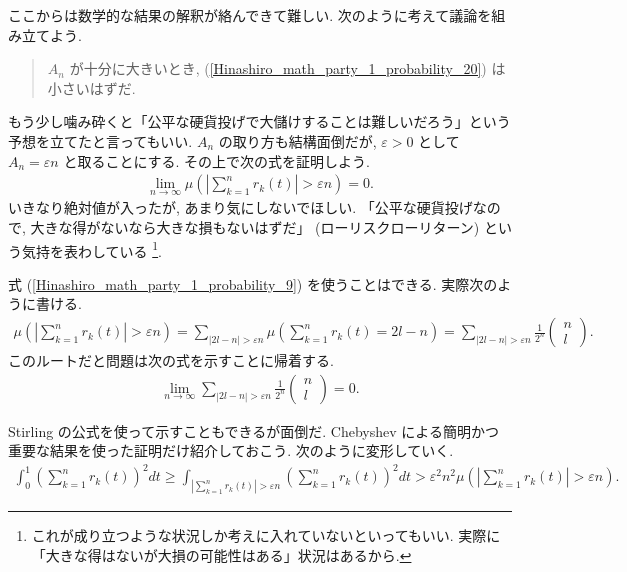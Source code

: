 \documentclass[openany, a4paper, oneside]{jsbook}
\theoremstyle{break}
\theoremstyle{breakdefn}
\newcommand{\abs}[1]{\left|#1\right|}
\newcommand{\rbk}[1]{\left (#1\right)}
\newcommand{\limntoinfty}{\lim_{n \to \infty}}
\begin{document}
ここからは数学的な結果の解釈が絡んできて難しい.
次のように考えて議論を組み立てよう.
\begin{quote}
$A_n$ が十分に大きいとき, (\ref{Hinashiro_math_party_1_probability_20}) は小さいはずだ.
\end{quote}

もう少し噛み砕くと「公平な硬貨投げで大儲けすることは難しいだろう」という予想を立てたと言ってもいい.
$A_n$ の取り方も結構面倒だが, $\varepsilon > 0$ として $A_n = \varepsilon n$ と取ることにする.
その上で次の式を証明しよう.
\begin{align}
 \limntoinfty \mu \rbk{\abs{\sum_{k=1}^n r_k (t)} > \varepsilon n} = 0. \label{Hinashiro_math_party_1_probability_8}
\end{align}
いきなり絶対値が入ったが, あまり気にしないでほしい.
「公平な硬貨投げなので, 大きな得がないなら大きな損もないはずだ」 (ローリスクローリターン) という気持を表わしている \footnote{これが成り立つような状況しか考えに入れていないといってもいい.
実際に「大きな得はないが大損の可能性はある」状況はあるから.
 }.

式 (\ref{Hinashiro_math_party_1_probability_9}) を使うことはできる.
実際次のように書ける.
\begin{align}
 \mu \rbk{\abs{\sum_{k=1}^n r_k (t)} > \varepsilon n}
 =
 \sum_{\abs{2l - n} > \varepsilon n} \mu \rbk{\sum_{k=1}^n r_k (t) = 2l - n}
 =
 \sum_{\abs{2l - n} > \varepsilon n} \frac{1}{2^n}
 \begin{pmatrix}
  n \\
  l
 \end{pmatrix}.
\end{align}
このルートだと問題は次の式を示すことに帰着する.
\begin{align}
 \limntoinfty \sum_{\abs{2l - n} > \varepsilon n} \frac{1}{2^n}
 \begin{pmatrix}
  n \\
  l
 \end{pmatrix}
 = 0. \label{Hinashiro_math_party_1_probability_12}
\end{align}

Stirling の公式を使って示すこともできるが面倒だ.
Chebyshev による簡明かつ重要な結果を使った証明だけ紹介しておこう.
次のように変形していく.
\begin{align}
 \int_0^1 \rbk{\sum_{k=1}^n r_k (t)}^2 dt
 \geq
 \int_{\abs{\sum_{k=1}^n r_k (t)} > \varepsilon n} \rbk{\sum_{k=1}^n r_k (t)}^2 dt
 >
 \varepsilon^2 n^2 \mu \rbk{\abs{\sum_{k=1}^n r_k (t)} > \varepsilon n}.
\end{align}
\end{document}
